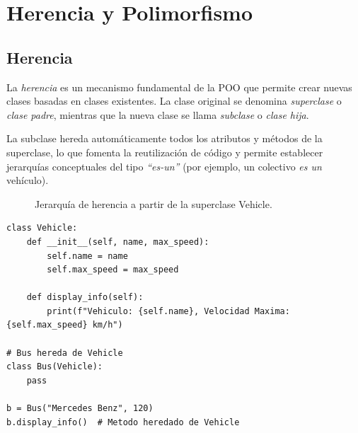 \chapter{Herencia y Polimorfismo}

\section{Herencia}
La \textit{herencia} es un mecanismo fundamental de la POO que permite crear nuevas clases basadas en clases existentes.
La clase original se denomina \textit{superclase} o \textit{clase padre}, mientras que la nueva clase se llama
\textit{subclase} o \textit{clase hija}.

La subclase hereda automáticamente todos los atributos y métodos de la superclase, lo que fomenta la reutilización de código
y permite establecer jerarquías conceptuales del tipo \textit{``es-un''} (por ejemplo, un colectivo \textit{es un} vehículo).

\begin{figure}[!ht]
  \centering
  \caption{Jerarquía de herencia a partir de la superclase Vehicle.}
  \label{fig:herencia_vehiculos}
\end{figure}

\begin{lstlisting}[caption={Sintaxis básica de herencia en Python.}, label={list:herencia_basica}]
class Vehicle:
    def __init__(self, name, max_speed):
        self.name = name
        self.max_speed = max_speed

    def display_info(self):
        print(f"Vehiculo: {self.name}, Velocidad Maxima: {self.max_speed} km/h")

# Bus hereda de Vehicle
class Bus(Vehicle):
    pass

b = Bus("Mercedes Benz", 120)
b.display_info()  # Metodo heredado de Vehicle
\end{lstlisting}

